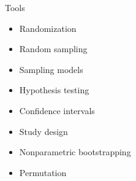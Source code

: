 \documentclass[11pt]{beamer}
\begin{document}
\begin{frame}{
	\begin{minipage}[t]{0.55\textwidth}
		Tools
	\end{minipage}
	\hfill
	\begin{minipage}[t]{0.35\textwidth}
		\flushright
	\end{minipage}
}{}
\begin{itemize}
	\item Randomization
	\item Random sampling
	\item Sampling models
	\item Hypothesis testing
	\item Confidence intervals
	\item Study design
	\item Nonparametric bootstrapping
	\item Permutation
	
\end{itemize}
\end{frame}
\end{document}
